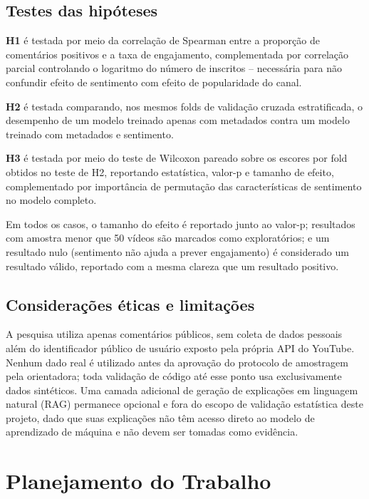 \documentclass[12pt,a4paper]{article}
\begin{document}
\subsection{Testes das hipóteses}

\textbf{H1} é testada por meio da correlação de Spearman entre a proporção de comentários positivos e a taxa de engajamento, complementada por correlação parcial controlando o logaritmo do número de inscritos -- necessária para não confundir efeito de sentimento com efeito de popularidade do canal.

\textbf{H2} é testada comparando, nos mesmos folds de validação cruzada estratificada, o desempenho de um modelo treinado apenas com metadados contra um modelo treinado com metadados e sentimento.

\textbf{H3} é testada por meio do teste de Wilcoxon pareado sobre os escores por fold obtidos no teste de H2, reportando estatística, valor-p e tamanho de efeito, complementado por importância de permutação das características de sentimento no modelo completo.

Em todos os casos, o tamanho do efeito é reportado junto ao valor-p; resultados com amostra menor que 50 vídeos são marcados como exploratórios; e um resultado nulo (sentimento não ajuda a prever engajamento) é considerado um resultado válido, reportado com a mesma clareza que um resultado positivo.

\subsection{Considerações éticas e limitações}

A pesquisa utiliza apenas comentários públicos, sem coleta de dados pessoais além do identificador público de usuário exposto pela própria API do YouTube. Nenhum dado real é utilizado antes da aprovação do protocolo de amostragem pela orientadora; toda validação de código até esse ponto usa exclusivamente dados sintéticos. Uma camada adicional de geração de explicações em linguagem natural (RAG) permanece opcional e fora do escopo de validação estatística deste projeto, dado que suas explicações não têm acesso direto ao modelo de aprendizado de máquina e não devem ser tomadas como evidência.

\section{Planejamento do Trabalho}
\end{document}
